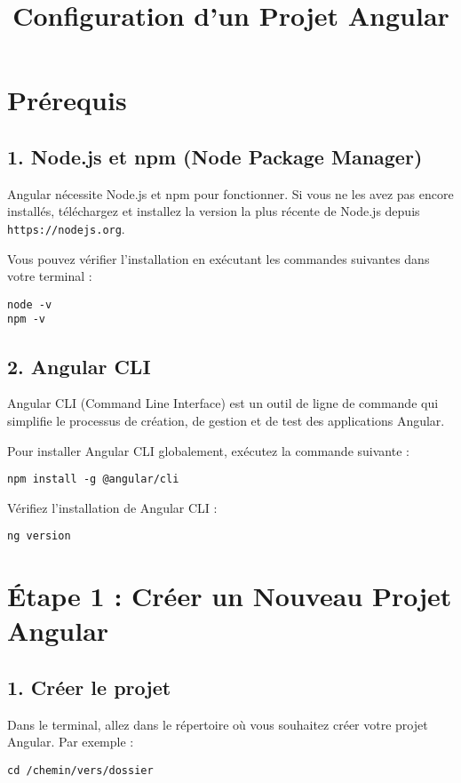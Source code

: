 \documentclass{article}
\title{Configuration d'un Projet Angular}
\author{}
\date{}
\begin{document}
\maketitle

\section*{Prérequis}
\subsection*{1. Node.js et npm (Node Package Manager)}
Angular nécessite Node.js et npm pour fonctionner. Si vous ne les avez pas encore installés, téléchargez et installez la version la plus récente de Node.js depuis \texttt{https://nodejs.org}.

Vous pouvez vérifier l'installation en exécutant les commandes suivantes dans votre terminal :
\begin{verbatim}
node -v
npm -v
\end{verbatim}

\subsection*{2. Angular CLI}
Angular CLI (Command Line Interface) est un outil de ligne de commande qui simplifie le processus de création, de gestion et de test des applications Angular.

Pour installer Angular CLI globalement, exécutez la commande suivante :
\begin{verbatim}
npm install -g @angular/cli
\end{verbatim}

Vérifiez l'installation de Angular CLI :
\begin{verbatim}
ng version
\end{verbatim}

\section*{Étape 1 : Créer un Nouveau Projet Angular}
\subsection*{1. Créer le projet}
Dans le terminal, allez dans le répertoire où vous souhaitez créer votre projet Angular. Par exemple :
\begin{verbatim}
cd /chemin/vers/dossier
\end{verbatim}
\end{document}
